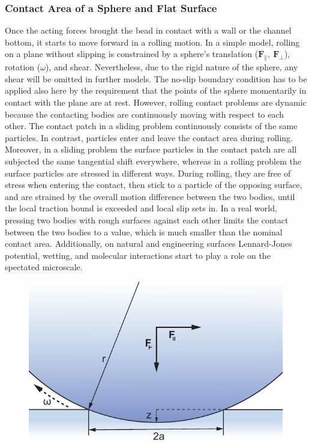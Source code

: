 \subsubsection{Contact Area of a Sphere and Flat Surface}
Once the acting forces brought the bead in contact with a wall or the channel bottom, it starts to move forward in a rolling motion. In a simple model, rolling on a plane without slipping is constrained by a sphere's translation ($\mathbf{F}_\parallel,\ \mathbf{F}_\perp$), rotation ($\omega$), and shear. Nevertheless, due to the rigid nature of the sphere, any shear will be omitted in further models.\cite{lit:fluid:rolling:rigid_viscoelastic} The no-slip boundary condition has to be applied also here by the requirement that the points of the sphere momentarily in contact with the plane are at rest. \newline However, rolling contact problems are dynamic because the contacting bodies are continuously moving with respect to each other. The contact patch in a sliding problem continuously consists of the same particles. In contrast, particles enter and leave the contact area during rolling. Moreover, in a sliding problem the surface particles in the contact patch are all subjected the same tangential shift everywhere, whereas in a rolling problem the surface particles are stressed in different ways. During rolling, they are free of stress when entering the contact, then stick to a particle of the opposing surface, and are strained by the overall motion difference between the two bodies, until the local traction bound is exceeded and local slip sets in.\cite{lit:fluid:rolling:contact_phenomena} \newline
In a real world, pressing two bodies with rough surfaces against each other limits the contact between the two bodies to a value, which is much smaller than the nominal contact area. Additionally, on natural and engineering surfaces Lennard-Jones potential, wetting, and molecular interactions start to play a role on the spectated microscale.\cite{lit:fluid:rolling:contact_ground_plane}

\begin{figure}[tbph!]
	\centering
	\includegraphics[width=0.7\linewidth]{Ressources/Fluidic/Rolling.pdf}
	\label{fig::fluidic:rolling_mechanics}
\end{figure}

